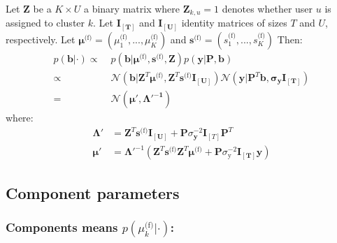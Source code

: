 \documentclass[smallextended]{svjour3}          %
\newcommand{\muk}{\mu_{k}^\text{(f)}}
\begin{document}
Let $\mathbf{Z}$ be a $K\times U$ a binary matrix where $\mathbf{Z}_{k,u}=1$ denotes whether user $u$ is assigned to cluster $k$. Let $\mathbf{I_{[T]}}$ and $\mathbf{I_{[U]}}$ identity matrices of sizes $T$ and $U$, respectively. Let $\boldsymbol{\mu}^\text{(f)} = (\mu_1^{\text{(f)}},...,\mu_K^{\text{(f)}})$ and  $\mathbf{s}^\text{(f)} = (s_1^{\text{(f)}},...,s_K^{\text{(f)}})$  Then:
\begin{align*}
p(\mathbf{b} | \cdot ) 
\propto&\;
p(\mathbf{b} | \boldsymbol{\mu}^\text{(f)}, \mathbf{s}^\text{(f)}, \mathbf{Z}) p(\mathbf{y} | \mathbf{P, b})\\
\propto&\; 
\mathcal{N}(\mathbf{b} | \mathbf{Z}^T\boldsymbol{\mu}^\text{(f)}, \mathbf{Z}^T \mathbf{s}^\text{(f)} \mathbf{I_{[U]}}) 
\mathcal{N}(\mathbf{y}|\mathbf{P}^T \mathbf{b, \sigma_y I_{[T]}})\\
=&\; 
\mathcal{N}(\mathbf{\boldsymbol{\mu'}, \boldsymbol{\Lambda'}^{-1}})
\end{align*}
where:
\begin{align*}
\mathbf{\Lambda'} &= \mathbf{Z}^T \mathbf{s}^\text{(f)} \mathbf{I_{[U]}} +  \mathbf{P}\sigma_\textbf{y}^{-2} \mathbf{I}_{[T]} \mathbf{P}^T  \\
\boldsymbol{\mu'} &= \mathbf{\Lambda'}^{-1}(\mathbf{Z}^T \mathbf{s}^\text{(f)} \mathbf{Z}^T\boldsymbol{\mu}^\text{(f)}+ \mathbf{P} \sigma_\text{y}^{-2} \mathbf{I_{[T]} y})
\end{align*}
\subsection{Component parameters}
\subsubsection*{Components means $p(\muk| \cdot )$:}
\end{document}
